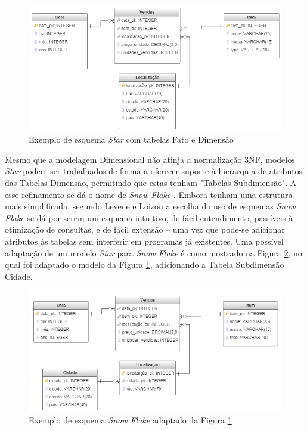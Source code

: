 \begin{figure}[htpb]
	\centering
		\includegraphics[width=13cm]{img/star_dim}
	\caption{Exemplo de esquema \textit{Star} com tabelas Fato e Dimensão}
	\label{fig:star_dim}
\end{figure}

Mesmo que a modelagem Dimensional não atinja a normalização 3NF, modelos \textit{Star} podem ser trabalhados de forma a oferecer suporte à hierarquia de atributos das Tabelas Dimensão, permitindo que estas tenham "Tabelas Subdimensão". A esse refinamento se dá o nome de \textit{Snow Flake} \cite{navathe2011banco}. Embora tenham uma estrutura mais simplificada, segundo Levene e Loizou \cite{levene2003snowflake} a escolha do uso de esquemas \textit{Snow Flake} se dá por serem um esquema intuitivo, de fácil entendimento, passíveis à otimização de consultas, e de fácil extensão -- uma vez que pode-se adicionar atributos às tabelas sem interferir em programas já existentes. Uma possível adaptação de um modelo \textit{Star} para \textit{Snow Flake} é como mostrado na Figura \ref{fig:snow}, no qual foi adaptado o modelo da Figura \ref{fig:star_dim}, adicionando a Tabela Subdimensão Cidade. 

\begin{figure}[htpb]
	\centering
		\includegraphics[width=13cm]{img/snow}
	\caption{Exemplo de esquema \textit{Snow Flake} adaptado da Figura \ref{fig:star_dim}}
	\label{fig:snow}
\end{figure}

